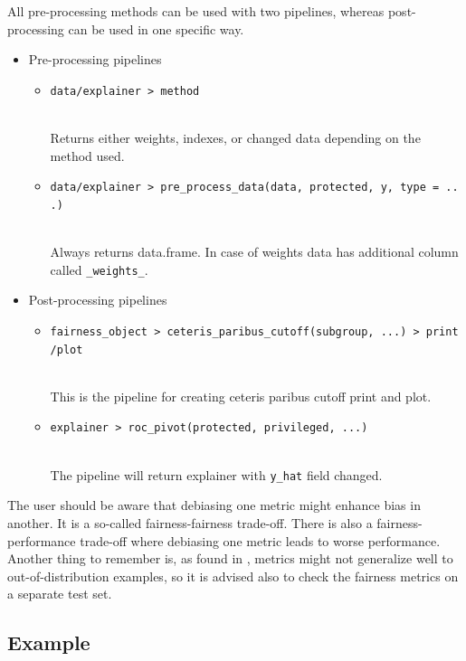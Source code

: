All pre-processing methods can be used with two pipelines, whereas
post-processing can be used in one specific way.

\begin{itemize}
\tightlist
\item
  Pre-processing pipelines

  \begin{itemize}
  \tightlist
  \item
    \texttt{data/explainer\ \textbar{}\textgreater{}\ method}\strut \\
    Returns either weights, indexes, or changed data depending on the
    method used.
  \item
    \texttt{data/explainer\ \textbar{}\textgreater{}\ pre\_process\_data(data,\ protected,\ y,\ type\ =\ ...)}\strut \\
    Always returns data.frame. In case of weights data has additional
    column called \texttt{\_weights\_}.
  \end{itemize}
\item
  Post-processing pipelines

  \begin{itemize}
  \tightlist
  \item
    \texttt{fairness\_object\ \textbar{}\textgreater{}\ ceteris\_paribus\_cutoff(subgroup,\ ...)\ \textbar{}\textgreater{}\ print/plot}\strut \\
    This is the pipeline for creating ceteris paribus cutoff print and
    plot.
  \item
    \texttt{explainer\ \textbar{}\textgreater{}\ roc\_pivot(protected,\ privileged,\ ...)}\strut \\
    The pipeline will return explainer with \texttt{y\_hat} field
    changed.
  \end{itemize}
\end{itemize}

The user should be aware that debiasing one metric might enhance bias in
another. It is a so-called fairness-fairness trade-off. There is also a
fairness-performance trade-off where debiasing one metric leads to worse
performance. Another thing to remember is, as found in
\citet{Agrawal2020DebiasingCI}, metrics might not generalize well to
out-of-distribution examples, so it is advised also to check the
fairness metrics on a separate test set.

\hypertarget{example-1}{%
\subsection{Example}\label{example-1}}

